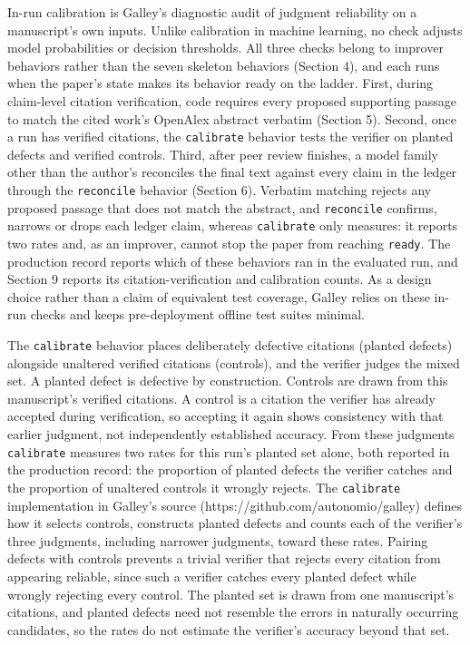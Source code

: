 \documentclass[
]{article}
\begin{document}
In-run calibration is Galley's diagnostic audit of judgment reliability
on a manuscript's own inputs. Unlike calibration in machine learning, no
check adjusts model probabilities or decision thresholds. All three
checks belong to improver behaviors rather than the seven skeleton
behaviors (Section 4), and each runs when the paper's state makes its
behavior ready on the ladder. First, during claim-level citation
verification, code requires every proposed supporting passage to match
the cited work's OpenAlex abstract verbatim (Section 5). Second, once a
run has verified citations, the \texttt{calibrate} behavior tests the
verifier on planted defects and verified controls. Third, after peer
review finishes, a model family other than the author's reconciles the
final text against every claim in the ledger through the
\texttt{reconcile} behavior (Section 6). Verbatim matching rejects any
proposed passage that does not match the abstract, and
\texttt{reconcile} confirms, narrows or drops each ledger claim, whereas
\texttt{calibrate} only measures: it reports two rates and, as an
improver, cannot stop the paper from reaching \texttt{ready}. The
production record reports which of these behaviors ran in the evaluated
run, and Section 9 reports its citation-verification and calibration
counts. As a design choice rather than a claim of equivalent test
coverage, Galley relies on these in-run checks and keeps pre-deployment
offline test suites minimal.

The \texttt{calibrate} behavior places deliberately defective citations
(planted defects) alongside unaltered verified citations (controls), and
the verifier judges the mixed set. A planted defect is defective by
construction. Controls are drawn from this manuscript's verified
citations. A control is a citation the verifier has already accepted
during verification, so accepting it again shows consistency with that
earlier judgment, not independently established accuracy. From these
judgments \texttt{calibrate} measures two rates for this run's planted
set alone, both reported in the production record: the proportion of
planted defects the verifier catches and the proportion of unaltered
controls it wrongly rejects. The \texttt{calibrate} implementation in
Galley's source (https://github.com/autonomio/galley) defines how it
selects controls, constructs planted defects and counts each of the
verifier's three judgments, including narrower judgments, toward these
rates. Pairing defects with controls prevents a trivial verifier that
rejects every citation from appearing reliable, since such a verifier
catches every planted defect while wrongly rejecting every control. The
planted set is drawn from one manuscript's citations, and planted
defects need not resemble the errors in naturally occurring candidates,
so the rates do not estimate the verifier's accuracy beyond that set.
\end{document}
